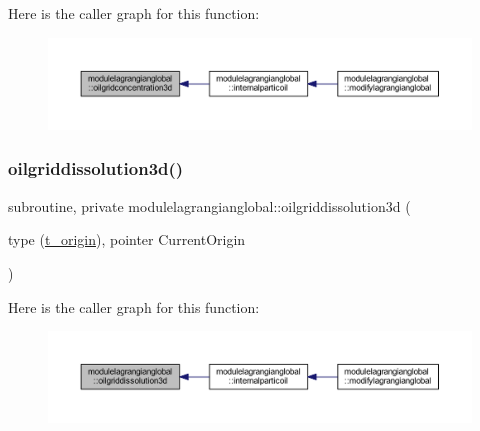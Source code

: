 Here is the caller graph for this function\+:\nopagebreak
\begin{figure}[H]
\begin{center}
\leavevmode
\includegraphics[width=350pt]{namespacemodulelagrangianglobal_a0f83256f515b161c9b16d0c3ed51d10b_icgraph}
\end{center}
\end{figure}
\mbox{\label{namespacemodulelagrangianglobal_ae9aaec1deb51656e3b70875e752b480f}} 
\subsubsection{\texorpdfstring{oilgriddissolution3d()}{oilgriddissolution3d()}}
{\footnotesize\ttfamily subroutine, private modulelagrangianglobal\+::oilgriddissolution3d (\begin{DoxyParamCaption}\item[{type (\mbox{\hyperlink{structmodulelagrangianglobal_1_1t__origin}{t\+\_\+origin}}), pointer}]{Current\+Origin }\end{DoxyParamCaption})\hspace{0.3cm}{\ttfamily [private]}}

Here is the caller graph for this function\+:\nopagebreak
\begin{figure}[H]
\begin{center}
\leavevmode
\includegraphics[width=350pt]{namespacemodulelagrangianglobal_ae9aaec1deb51656e3b70875e752b480f_icgraph}
\end{center}
\end{figure}
\mbox{\label{namespacemodulelagrangianglobal_aa8eb3a0829714276b28efb92746fc92f}} 
